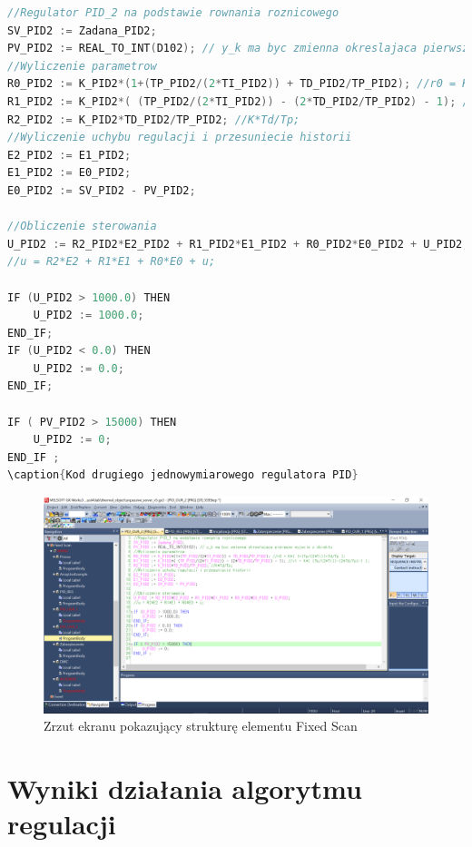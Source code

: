 \begin{lstlisting}[caption={Kod drugiego jednowymiarowego regulatora PID}, language=C]
//Regulator PID_2 na podstawie rownania roznicowego
SV_PID2 := Zadana_PID2;
PV_PID2 := REAL_TO_INT(D102); // y_k ma byc zmienna okreslajaca pierwsze wyjscie z obiektu 
//Wyliczenie parametrow
R0_PID2 := K_PID2*(1+(TP_PID2/(2*TI_PID2)) + TD_PID2/TP_PID2); //r0 = K*( 1+(Tp/(2*Ti))+Td/Tp );
R1_PID2 := K_PID2*( (TP_PID2/(2*TI_PID2)) - (2*TD_PID2/TP_PID2) - 1); //r1 = K*( (Tp/(2*Ti))-(2*Td/Tp)-1 );
R2_PID2 := K_PID2*TD_PID2/TP_PID2; //K*Td/Tp;
//Wyliczenie uchybu regulacji i przesuniecie historii
E2_PID2 := E1_PID2;
E1_PID2 := E0_PID2;
E0_PID2 := SV_PID2 - PV_PID2;

//Obliczenie sterowania
U_PID2 := R2_PID2*E2_PID2 + R1_PID2*E1_PID2 + R0_PID2*E0_PID2 + U_PID2;
//u = R2*E2 + R1*E1 + R0*E0 + u;

IF (U_PID2 > 1000.0) THEN
	U_PID2 := 1000.0;
END_IF;
IF (U_PID2 < 0.0) THEN
	U_PID2 := 0.0;
END_IF;

IF ( PV_PID2 > 15000) THEN
	U_PID2 := 0;
END_IF ;
\caption{Kod drugiego jednowymiarowego regulatora PID}
\end{lstlisting}

\begin{figure}[H]
\includegraphics[scale=0.43]{sections/thermal/DrzewkoZFolderami.png}
\caption{Zrzut ekranu pokazujący strukturę elementu Fixed Scan}
\end{figure}


\section{Wyniki działania algorytmu regulacji}
\label{thermal_pid_wyniki}


